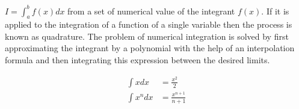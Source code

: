 \documentclass{article}
\begin{document}
              $I=\int_{a}^{b}f(x)dx$ from a set of numerical value of the integrant $f(x)$. 
              If it is applied to the integration of a function of a single variable then the 
              process is known as quadrature. The problem of numerical integration is solved by 
              first approximating the integrant by a polynomial with the help of an interpolation 
              formula and then integrating this expression between the desired limits.
              
              \begin{align*}
                \int xdx&=\frac{x^2}{2}\\
                \int x^ndx&=\frac{x^{n+1}}{n+1}
              \end{align*}
            
            
            
            
            
            
            
\end{document}
